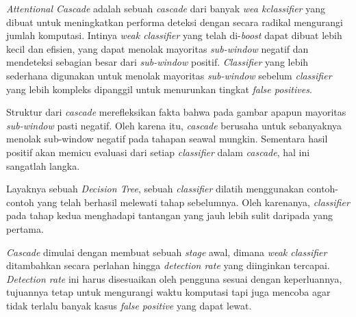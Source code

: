 \emph{Attentional Cascade} adalah sebuah \emph{cascade} dari banyak 
\emph{wea kclassifier} yang dibuat untuk meningkatkan performa deteksi dengan secara radikal mengurangi jumlah 
komputasi. Intinya \emph{weak classifier} yang telah di-\emph{boost} dapat dibuat lebih 
kecil dan efisien, yang dapat menolak mayoritas \emph{sub-window} negatif dan 
mendeteksi sebagian besar dari \emph{sub-window} positif. \emph{Classifier} yang lebih 
sederhana digunakan untuk menolak mayoritas \emph{sub-window} sebelum \emph{classifier} 
yang lebih kompleks dipanggil untuk menurunkan tingkat \emph{false positives}.

Struktur dari \emph{cascade} merefleksikan 
fakta bahwa pada gambar apapun mayoritas \emph{sub-window} pasti negatif. 
Oleh karena itu, \emph{cascade} berusaha untuk sebanyaknya menolak sub-window 
negatif pada tahapan seawal mungkin. Sementara hasil positif 
akan memicu evaluasi dari setiap \emph{classifier} dalam \emph{cascade}, 
hal ini sangatlah langka.

Layaknya sebuah \emph{Decision Tree}, sebuah \emph{classifier} dilatih menggunakan 
contoh-contoh yang telah berhasil melewati tahap sebelumnya. Oleh karenanya, 
\emph{classifier} pada tahap kedua menghadapi tantangan yang jauh lebih sulit 
daripada yang pertama.

\emph{Cascade} dimulai dengan membuat sebuah \textit{stage} awal, dimana \textit{weak classifier} 
ditambahkan secara perlahan hingga \emph{detection rate} yang diinginkan tercapai. \emph{Detection rate} 
ini harus disesuaikan oleh pengguna sesuai dengan keperluannya, tujuannya tetap untuk mengurangi 
waktu komputasi tapi juga mencoba agar tidak terlalu banyak kasus \emph{false positive} yang dapat 
lewat.

